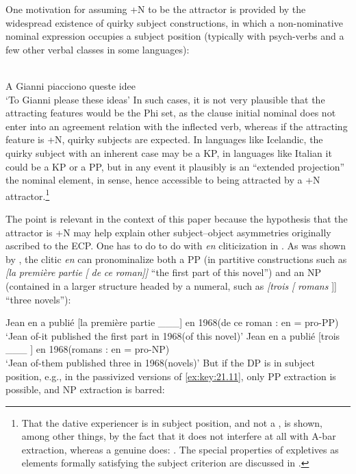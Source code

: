 \documentclass[output=paper]{langsci/langscibook}
\begin{document}
\begin{exe}
One motivation for assuming +N to be the attractor is provided by the
widespread existence of quirky subject constructions, in which a non-nominative
nominal expression occupies a subject position (typically with psych-verbs and
a few other verbal classes in some languages):

\ea%
    \label{ex:key:21.10}\\
    A Gianni    piacciono   queste idee\\
    ‘To Gianni  please        these ideas’
\z
%
In such cases, it is not very plausible that the attracting features would be
the Phi set, as the clause initial nominal does not enter into an agreement
relation with the inflected verb, whereas if the attracting feature is +N,
quirky subjects are expected. In languages like Icelandic, the quirky subject
with an inherent case may be a KP, in languages like Italian it could be a KP
or a PP, but in any event it plausibly is an “extended projection” the nominal
element, in  sense, hence accessible to being attracted
by a +N attractor.\footnote{That the dative experiencer is in subject
    position, and not a , is shown, among other things, by the fact that it
    does not interfere at all with A-bar extraction, whereas a genuine  does:
\citealt{Calabrese1986,BellettiRizzi1988}. The special properties of
expletives as elements formally satisfying the subject criterion are discussed
in \citet{RizziShlonsky2007}.}

The point is relevant in the context of this paper because the hypothesis that
the attractor is +N may help explain other subject--object asymmetries
originally ascribed to the ECP.  One has to do to do with \emph{en}
cliticization in . As was shown by \citet{Ruwet1972}, the clitic
\emph{en} can pronominalize both a PP (in partitive constructions such as
\emph{[la} \emph{première} \emph{partie} \emph{[} \emph{de} \emph{ce}
\emph{roman]]} “the first part of this novel”) and an NP (contained in a larger
structure headed by a numeral, such as \emph{[trois} \emph{[}
\emph{romans} ]] “three novels”):

\ea%
    \label{ex:key:21.11}
    \ea Jean  en a publié [la première partie \_\_\_] en 1968\hfill (de ce roman : en = pro-PP)\\
        ‘Jean of-it published the first part in 1968\hfill (of this novel)’
    \ex Jean  en a publié [trois \_\_\_ ] en 1968\hfill (romans : en = pro-NP)\\
        ‘Jean of-them published three in 1968\hfill (novels)’
    \z
\z
%
But if the DP is in subject position, e.g., in the passivized versions of
\eqref{ex:key:21.11}, only PP extraction is possible, and NP extraction is
barred:


\end{exe}
\end{document}
